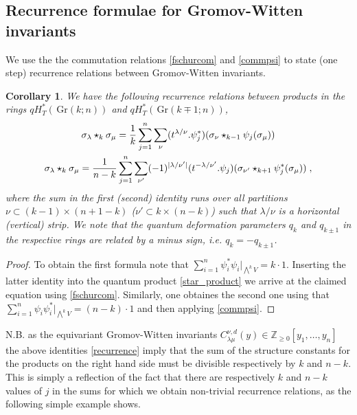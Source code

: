 \documentclass[12pt]{amsart}
\newcommand{\Z}{\mathbb{Z}}
\newcommand{\Gr}{\,\mathrm{Gr}}
\newtheorem{cor}[prop]{Corollary}
\numberwithin{equation}{section}
\numberwithin{figure}{section}
\begin{document}
\subsection{Recurrence formulae for Gromov-Witten invariants}
We use the the commutation relations \eqref{fschurcom} and \eqref{commpsi} to state (one step) recurrence relations between Gromov-Witten invariants.
\begin{cor}
    We have the following recurrence relations between products in the rings $qH_T^*(\Gr(k;n))$ and $qH_T^*(\Gr(k\mp1;n))$,
    \begin{gather} \label{recurrence}
        \sigma_\lambda\star_k\sigma_\mu=\frac{1}{k}\sum_{j=1}^n\sum_{\nu}(t^{\lambda/\nu}.\psi^*_j)(\sigma_\nu\star_{k-1}\psi_{j}(\sigma_\mu))\\
        \sigma_\lambda\star_k\sigma_\mu=\frac{1}{n-k}\sum_{j=1}^n\sum_{\nu'}(-1)^{|\lambda/\nu'|}(t^{-\lambda/\nu'}.\psi_j)(\sigma_{\nu'}\star_{k+1}\psi^*_{j}(\sigma_\mu))\notag\;,
    \end{gather}
    where the sum in the first (second) identity runs over all partitions $\nu\subset (k-1)\times(n+1-k)$ ($\nu'\subset k\times (n-k)$) such that $\lambda/\nu$ is a horizontal (vertical) strip. We note that the quantum deformation parameters $q_k$ and $q_{k\pm1}$ in the respective rings are related by a minus sign, i.e. $q_k=-q_{k\pm1}$.
\end{cor}
\begin{proof}
    To obtain the first formula note that $\sum_{i=1}^n\psi^*_i\psi_i|_{\bigwedge^kV}=k\cdot 1$. Inserting the latter identity into the quantum product \eqref{star_product} we arrive at the claimed equation using \eqref{fschurcom}. Similarly, one obtaines the second one using that $\sum_{i=1}^n\psi_i\psi^*_i|_{\bigwedge^kV}=(n-k)\cdot 1$ and then applying \eqref{commpsi}.
\end{proof}
N.B. as the equivariant Gromov-Witten invariants $C_{\lambda\mu}^{\nu,d}(y)\in\Z_{\ge 0}[y_1,\ldots,y_n]$ the above identities \eqref{recurrence} imply that the sum of the structure constants for the products on the right hand side must be divisible respectively by $k$ and $n-k$. This is simply a reflection of the fact that there are respectively $k$ and $n-k$ values of $j$ in the sums for which we obtain non-trivial recurrence relations, as the following simple example shows.
\end{document}
